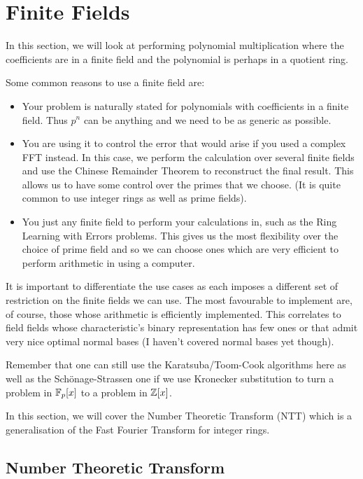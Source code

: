 \chapter{Finite Fields}\label{finite-fields}

In this section, we will look at performing polynomial multiplication where the coefficients are in a finite field and the polynomial is perhaps in a quotient ring.

Some common reasons to use a finite field are:
\begin{itemize}
\item Your problem is naturally stated for polynomials with coefficients
in a finite field. Thus $p^n$ can be anything and we need to be as generic as possible.
\item You are using it to control the error that would arise if you used a complex FFT instead. In this case, we perform the calculation over several finite fields and use the Chinese Remainder Theorem to reconstruct the final result. This allows us to have some control over the primes that we choose. (It is quite common to use integer rings as well as prime fields).
\item You just any finite field to perform your calculations in, such as the Ring Learning with Errors problems. This gives us the most flexibility over the choice of prime field and so we can choose ones which are very efficient to perform arithmetic in using a computer.
\end{itemize}

It is important to differentiate the use cases as each imposes a different set of restriction on the finite fields we can use. The most favourable to implement are, of course, those whose arithmetic is efficiently implemented. This correlates to field fields whose characteristic's binary representation has few ones or that admit very nice optimal normal bases (I haven't covered normal bases yet though).

Remember that one can still use the Karatsuba/Toom-Cook algorithms here as well as the Sch\"{o}nage-Strassen one if we use Kronecker substitution to turn a problem in $\mathbb{F}_p[x]$ to a problem in ${\mathbb Z}[x]$.

In this section, we will cover the Number Theoretic Transform (NTT) which is a generalisation of the Fast Fourier Transform for integer rings. 

\section{Number Theoretic Transform}
\label{sec:ntt}

